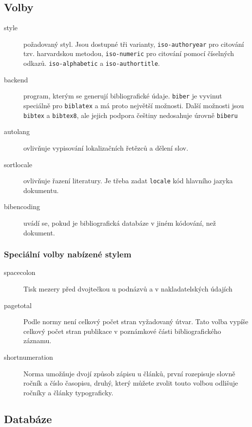 \documentclass[a4paper,10pt]{ltxdockit}
\def\t|#1|{\texttt{#1}}
\begin{document}
\subsection{Volby}
\begin{description}
\item[style] požadovaný styl. Jsou dostupné tři varianty, \t|iso-authoryear|
  pro citování tzv. harvardskou metodou, \t|iso-numeric| pro citování pomocí
  číselných odkazů. \t|iso-alphabetic| a \t|iso-authortitle|.

\item[backend] program, kterým se generují bibliografické údaje. \t|biber| je
  vyvinut speciálně pro \t|biblatex| a má proto největší možnosti. Další
  možnosti jsou \t|bibtex| a \t|bibtex8|, ale jejich podpora češtiny nedosahuje
  úrovně \t|biberu|

\item[autolang] ovlivňuje vypisování lokalizačních řetězců a dělení slov.
\item[sortlocale] ovlivňuje řazení literatury. Je třeba zadat \t|locale| kód hlavního jazyka dokumentu.
\item[bibencoding] uvádí se, pokud je bibliografická databáze v jiném kódování, než dokument. 

\end{description}

\subsubsection{Speciální volby nabízené stylem}

\begin{description}
  \item[spacecolon] Tisk mezery před dvojtečkou u podnázvů a v nakladatelských údajích
  \item[pagetotal] Podle normy není celkový počet stran vyžadovaný útvar. Tato
    volba vypíše celkový počet stran publikace v poznámkové části
    bibliografického záznamu.
  \item[shortnumeration] Norma umožňuje dvojí způsob zápisu u článků, první
    rozepisuje slovně ročník a číslo časopisu, druhý, který můžete zvolit touto
    volbou odlišuje ročníky a články typograficky.
\end{description}


\subsection{Databáze}
\end{document}
